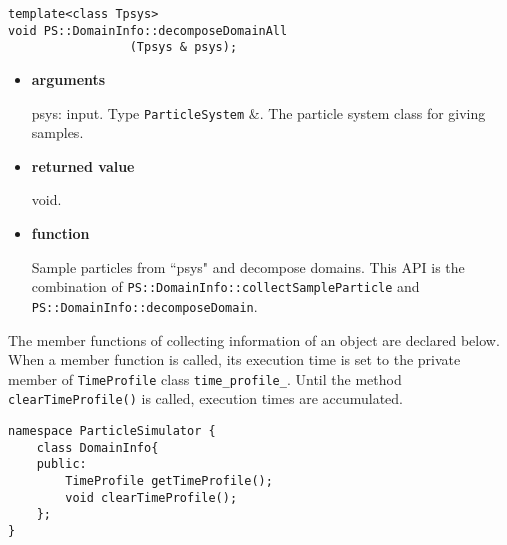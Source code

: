 \begin{screen}
\begin{verbatim}
template<class Tpsys>
void PS::DomainInfo::decomposeDomainAll
                 (Tpsys & psys);
\end{verbatim}
\end{screen}

\begin{itemize}

\item {\bf arguments}

psys: input. Type {\tt ParticleSystem} \&. The particle system class for giving samples.

\item {\bf returned value}

void.

\item {\bf function}

Sample particles from ``psys" and decompose domains. This API is the
combination of {\tt PS::DomainInfo::collectSampleParticle} and {\tt
PS::DomainInfo::decomposeDomain}.


\end{itemize}



The member functions of collecting information of an object are
declared below. When a member function is called, its execution time
is set to the private member of {\tt TimeProfile} class
\texttt{time\_profile\_}. Until the method \texttt{clearTimeProfile()} is called,
execution times are accumulated.


\begin{lstlisting}[caption=DomainInfo3]
namespace ParticleSimulator {
    class DomainInfo{
    public:
        TimeProfile getTimeProfile();
        void clearTimeProfile();
    };
}
\end{lstlisting}

